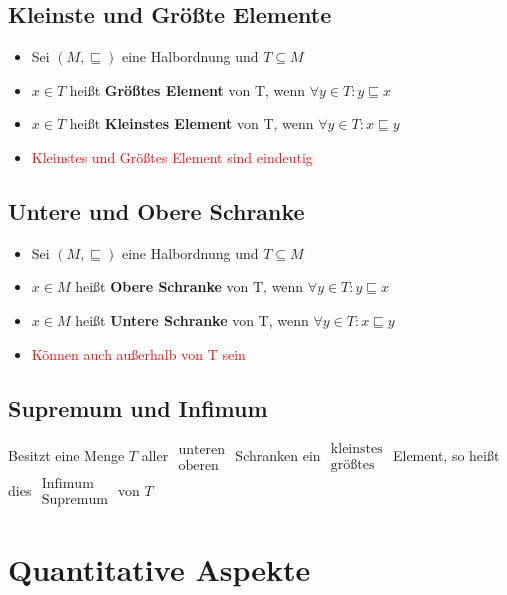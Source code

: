 \documentclass[a4paper,portrait]{scrartcl}
\begin{document}
\subsection{Kleinste und Größte Elemente}
\begin{itemize}
\item Sei $ (M, \sqsubseteq) $ eine Halbordnung und $ T \subseteq M $
\item $ x \in T $ heißt \textbf{Größtes Element} von T, wenn $ \forall y \in T: y \sqsubseteq x $
\item $ x \in T $ heißt \textbf{Kleinstes Element} von T, wenn $ \forall y \in T: x \sqsubseteq y $
\item \textcolor{red}{Kleinstes und Größtes Element sind eindeutig}
\end{itemize}
\subsection{Untere und Obere Schranke}
\begin{itemize}
\item Sei $ (M, \sqsubseteq) $ eine Halbordnung und $ T \subseteq M $
\item $ x \in M $ heißt \textbf{Obere Schranke} von T, wenn $ \forall y \in T: y \sqsubseteq x $
\item $ x \in M $ heißt \textbf{Untere Schranke} von T, wenn $ \forall y \in T: x \sqsubseteq y $
\item \textcolor{red}{Können auch außerhalb von T sein}
\end{itemize}
\subsection{Supremum und Infimum}
Besitzt eine Menge $T$ aller
$\begin{array}{ll}
\text{unteren} \\
\text{oberen}
\end{array}$
Schranken ein 
$\begin{array}{ll}
\text{kleinstes} \\
\text{größtes}
\end{array}$
Element, so heißt dies 
$\begin{array}{ll}
\text{Infimum} \\
\text{Supremum}
\end{array}$
von $T$
\section{Quantitative Aspekte}
\end{document}
